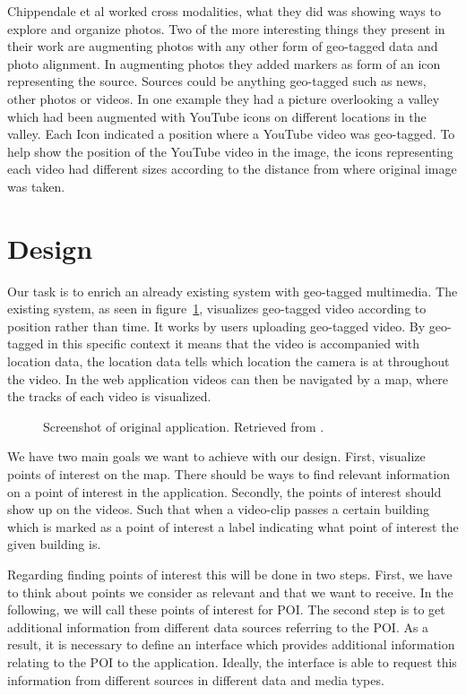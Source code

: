 \documentclass[journal]{IEEEtran}
\begin{document}
Chippendale et al\cite{collective-photography} worked cross modalities, what they did was showing ways to explore and organize photos. Two of the more interesting things they present in their work are augmenting photos with any other form of geo-tagged data and photo alignment. In augmenting photos they added markers as form of an icon representing the source. Sources could be anything geo-tagged such as news, other photos or videos. In one example they had a picture overlooking a valley which had been augmented with YouTube icons on different locations in the valley. Each Icon indicated a position where a YouTube video was geo-tagged. To help show the position of the YouTube video in the image, the icons representing each video had different sizes according to the distance from where original image was taken.

\section{Design}
Our task is to enrich an already existing system\cite{originalsystem} with geo-tagged multimedia. The existing system, as seen in figure~\ref{original-app}, visualizes geo-tagged video according to position rather than time. It works by users uploading geo-tagged video. By geo-tagged in this specific context it means that the video is accompanied with location data, the location data tells which location the camera is at throughout the video. In the web application videos can then be navigated by a map, where the tracks of each video is visualized.

        \begin{figure}[htb]
         \centering
         \caption{Screenshot of original application. Retrieved from \cite{originalsystem}.}
         \label{original-app}
        \end{figure}

We have two main goals we want to achieve with our design. First, visualize points of interest on the map. There should be ways to find relevant information on a point of interest in the application. Secondly, the points of interest should show up on the videos. Such that when a video-clip passes a certain building which is marked as a point of interest a label indicating what point of interest the given building is. 

Regarding finding points of interest this will be done in two steps. First, we have to think about points we consider as relevant and that we want to receive. In the following, we will call these points of interest for POI.  The second step is to get additional information from different data sources referring to the POI. As a result, it is necessary to define an interface which provides additional information relating to the POI to the application. Ideally, the interface is able to request this information from different sources in different data and media types.
\end{document}
